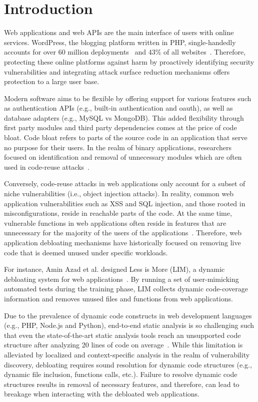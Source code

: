 \section{Introduction}

Web applications and web APIs are the main interface of users with online services. 
WordPress, the blogging platform written in PHP, single-handedly accounts for over 60 million deployments~\cite{wpstatsbuildwith} and 43\% of all websites~\cite{wpstatsw3techs}. 
Therefore, protecting these online platforms against harm by proactively identifying security vulnerabilities and integrating attack surface reduction mechanisms offers protection to a large user base. 

Modern software aims to be flexible by offering support for various features such as authentication APIs (e.g., built-in authentication and oauth), as well as database adapters (e.g., MySQL vs MongoDB). 
This added flexibility through first party modules and third party dependencies comes at the price of code bloat. 
Code bloat refers to parts of the source code in an application that serve no purpose for their users. 
In the realm of binary applications, researchers focused on identification and removal of unnecessary modules which are often used in code-reuse attacks~\cite{redini2019b, quach2018debloating, 255308}. 

Conversely, code-reuse attacks in web applications only account for a subset of niche vulnerabilities (i.e., object injection attacks). 
In reality, common web application vulnerabilities such as XSS and SQL injection, and those rooted in misconfigurations, reside in reachable parts of the code. 
At the same time, vulnerable functions in web applications often reside in features that are unnecessary for the majority of the users of the applications~\cite{azad2019less}. 
Therefore, web application debloating mechanisms have historically focused on removing live code that is deemed unused under specific workloads. 

For instance, Amin Azad et al. designed Less is More (LIM), a dynamic debloating system for web applications~\cite{azad2019less}. 
By running a set of user-mimicking automated tests during the training phase, LIM collects dynamic code-coverage information and removes unused files and functions from web applications. 

Due to the prevalence of dynamic code constructs in web development languages (e.g., PHP, Node.js and Python), end-to-end static analysis is so challenging such that even the state-of-the-art static analysis tools reach an unsupported code structure after analyzing 20 lines of code on average~\cite{altestability}. 
While this limitation is alleviated by localized and context-specific analysis in the realm of vulnerability discovery, debloating requires sound resolution for dynamic code structures (e.g., dynamic file inclusion, functions calls, etc.). 
Failure to resolve dynamic code structures results in removal of necessary features, and therefore, can lead to breakage when interacting with the debloated web applications.

